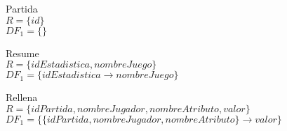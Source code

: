 \item{{\large Partida}}\\
	$R = \{id\}$\\
	$DF_1 = \{\}$\\

\item {{\large Resume}}\\
	$R = \{idEstadistica, nombreJuego\}$\\
	$DF_1 = \{idEstadistica \rightarrow nombreJuego\}$\\

\item{{\large Rellena}}\\
	$R = \{idPartida, nombreJugador, nombreAtributo, valor\}$\\
	$DF_1 = \{\{idPartida, nombreJugador, nombreAtributo\} \rightarrow valor\}$
